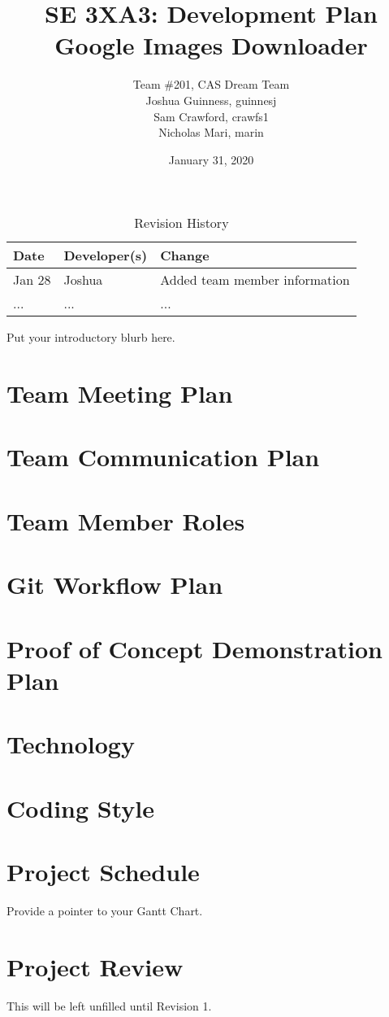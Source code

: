 \documentclass{article}
\title{SE 3XA3: Development Plan\\Google Images Downloader}
\author{Team \#201, CAS Dream Team
		\\ Joshua Guinness, guinnesj
		\\ Sam Crawford, crawfs1
		\\ Nicholas Mari, marin
}
\date{January 31, 2020}
\begin{document}
\begin{table}[hp]
\caption{Revision History} \label{TblRevisionHistory}
\begin{tabularx}{\textwidth}{llX}
\toprule
\textbf{Date} & \textbf{Developer(s)} & \textbf{Change}\\
\midrule
Jan 28 & Joshua & Added team member information\\
... & ... & ...\\
\bottomrule
\end{tabularx}
\end{table}

\newpage

\maketitle

Put your introductory blurb here.

\section{Team Meeting Plan}

\section{Team Communication Plan}

\section{Team Member Roles}

\section{Git Workflow Plan}

\section{Proof of Concept Demonstration Plan}

\section{Technology}

\section{Coding Style}

\section{Project Schedule}

Provide a pointer to your Gantt Chart.

\section{Project Review}
This will be left unfilled until Revision 1.
\end{document}
